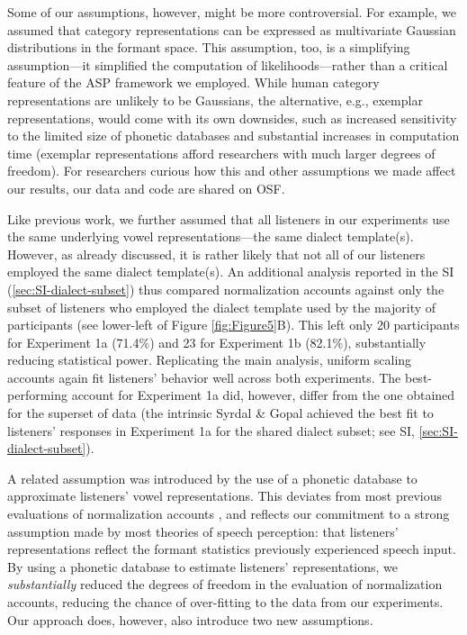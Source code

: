 \documentclass[preprint]{JASA}
\begin{document}
Some of our assumptions, however, might be more controversial. For example, we assumed that category representations can be expressed as multivariate Gaussian distributions in the formant space. This assumption, too, is a simplifying assumption---it simplified the computation of likelihoods---rather than a critical feature of the ASP framework we employed. While human category representations are unlikely to be Gaussians, the alternative, e.g., exemplar representations, would come with its own downsides, such as increased sensitivity to the limited size of phonetic databases and substantial increases in computation time (exemplar representations afford researchers with much larger degrees of freedom). For researchers curious how this and other assumptions we made affect our results, our data and code are shared on OSF.

Like previous work, we further assumed that all listeners in our experiments use the same underlying vowel representations---the same dialect template(s). However, as already discussed, it is rather likely that not all of our listeners employed the same dialect template(s). An additional analysis reported in the SI (\ref{sec:SI-dialect-subset}) thus compared normalization accounts against only the subset of listeners who employed the dialect template used by the majority of participants (see lower-left of Figure \ref{fig:Figure5}B). This left only 20 participants for Experiment 1a (71.4\%) and 23 for Experiment 1b (82.1\%), substantially reducing statistical power. Replicating the main analysis, uniform scaling accounts again fit listeners' behavior well across both experiments. The best-performing account for Experiment 1a did, however, differ from the one obtained for the superset of data (the intrinsic Syrdal \& Gopal achieved the best fit to listeners' responses in Experiment 1a for the shared dialect subset; see SI, \ref{sec:SI-dialect-subset}).

A related assumption was introduced by the use of a phonetic database to approximate listeners' vowel representations. This deviates from most previous evaluations of normalization accounts \citetext{\citealp{mcmurray-jongman2011}; \citealp{barreda2021}; \citealp[but see][]{richter2017}}, and reflects our commitment to a strong assumption made by most theories of speech perception: that listeners' representations reflect the formant statistics previously experienced speech input. By using a phonetic database to estimate listeners' representations, we \emph{substantially} reduced the degrees of freedom in the evaluation of normalization accounts, reducing the chance of over-fitting to the data from our experiments. Our approach does, however, also introduce two new assumptions.
\end{document}
